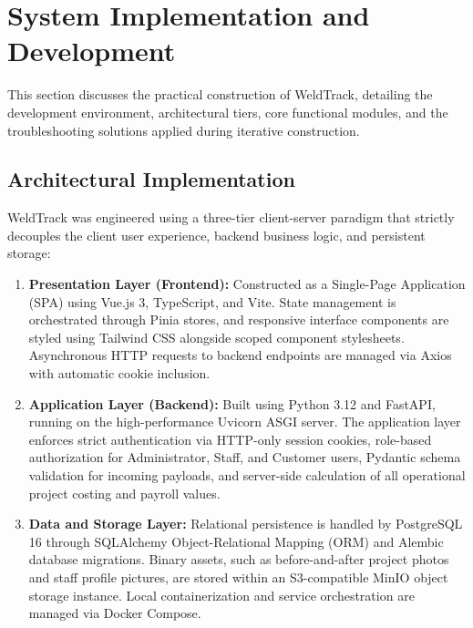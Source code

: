 \documentclass[12pt, letterpaper]{article}
\begin{document}
\section{System Implementation and Development}
\hspace*{2em} This section discusses the practical construction of WeldTrack, detailing the development environment, architectural tiers, core functional modules, and the troubleshooting solutions applied during iterative construction.

\subsection{Architectural Implementation}
\hspace*{2em} WeldTrack was engineered using a three-tier client-server paradigm that strictly decouples the client user experience, backend business logic, and persistent storage:
\begin{enumerate}[label=\alph*.]
    \item \textbf{Presentation Layer (Frontend):} Constructed as a Single-Page Application (SPA) using Vue.js 3, TypeScript, and Vite. State management is orchestrated through Pinia stores, and responsive interface components are styled using Tailwind CSS alongside scoped component stylesheets. Asynchronous HTTP requests to backend endpoints are managed via Axios with automatic cookie inclusion.
    \item \textbf{Application Layer (Backend):} Built using Python 3.12 and FastAPI, running on the high-performance Uvicorn ASGI server. The application layer enforces strict authentication via HTTP-only session cookies, role-based authorization for Administrator, Staff, and Customer users, Pydantic schema validation for incoming payloads, and server-side calculation of all operational project costing and payroll values.
    \item \textbf{Data and Storage Layer:} Relational persistence is handled by PostgreSQL 16 through SQLAlchemy Object-Relational Mapping (ORM) and Alembic database migrations. Binary assets, such as before-and-after project photos and staff profile pictures, are stored within an S3-compatible MinIO object storage instance. Local containerization and service orchestration are managed via Docker Compose.
\end{enumerate}
\end{document}
